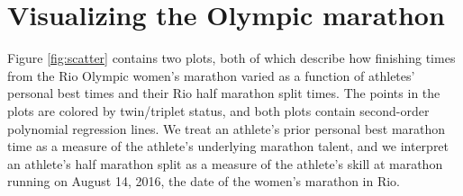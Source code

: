 \documentclass[12pt,titlepage]{article}
\begin{document}
\section*{Visualizing the Olympic marathon}

Figure \ref{fig:scatter} contains two plots, both of which describe
how finishing times from the Rio Olympic women's marathon varied as a
function of athletes' personal best times and their Rio half marathon
split times.  The points in the plots are colored by twin/triplet
status, and both plots contain second-order polynomial regression
lines.  We treat an athlete's prior personal best marathon time as a
measure of the athlete's underlying marathon talent, and we interpret
an athlete's half marathon split as a measure of the athlete's skill
at marathon running on August 14, 2016, the date of the women's
marathon in Rio.
\end{document}
